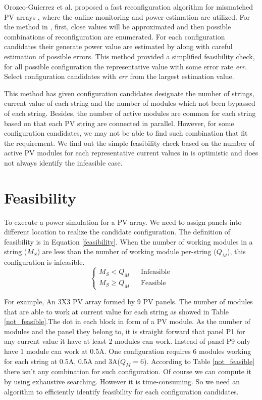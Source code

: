 \documentclass[conference]{IEEEtran}
\begin{document}
Orozco-Guierrez et al. proposed a fast reconfiguration algorithm for mismatched PV arrays \cite{orozco2016optimized}, where the online monitoring \cite{carotenuto2014online} and power estimation \cite{orozco2015fast} are utilized. For the method in \cite{orozco2016optimized}, first, close values will be approximated and then possible combinations of reconfiguration are enumerated. For each configuration candidates their generate power value are estimated by \cite{orozco2015fast} along with careful estimation of possible errors. This method provided a simplified feasibility check, for all possible configuration the representative value with some error rate \textit{err}. Select configuration candidates with \textit{err} from the largest estimation value.

This method has given configuration candidates designate the number of strings, current value of each string and the number of modules which not been bypassed of each string. Besides, the number of active modules are common for each string based on that each PV string are connected in parallel. However, for some configuration candidates, we may not be able to find such combination that fit the requirement. We find out the simple feasibility check based on the number of active PV modules for each representative current values in \cite{orozco2016optimized} is optimistic and does not always identify the infeasible case.

\section{Feasibility}\label{Sec4}
To execute a power simulation for a PV array. We need to assign panels into different location to realize the candidate configuration. The definition of feasibility is in Equation \ref{feasibility}. When the number of working modules in a string ($M_S$) are less than the number of working module per-string ($Q_M$), this configuration is infeasible.
\begin{equation}
    \left\{\begin{matrix}
        M_S < Q_{M} & & \text{Infeasible}\\ 
        M_S \geqslant Q_{M} & & \text{Feasible} 
    \end{matrix}\right.
    \label{feasibility}
\end{equation}

For example, An 3X3 PV array formed by 9 PV panels. The number of modules that are able to work at current value for each string as showed in Table \ref{not_feasible}.The dot in each block in form of a PV module. As the number of modules and the panel they belong to, it is straight forward that panel P1 for any current value it have at least 2 modules can work. Instead of panel P9 only have 1 module can work at 0.5A.
One configuration requires 6 modules working for each string at 0.5A, 0.5A and 3A($Q_M = 6$). According to Table \ref{not_feasible} there isn't any combination for such configuration. Of course we can compute it by using exhaustive searching. However it is time-consuming. So we need an algorithm to efficiently identify feasibility for each configuration candidates.
\end{document}
